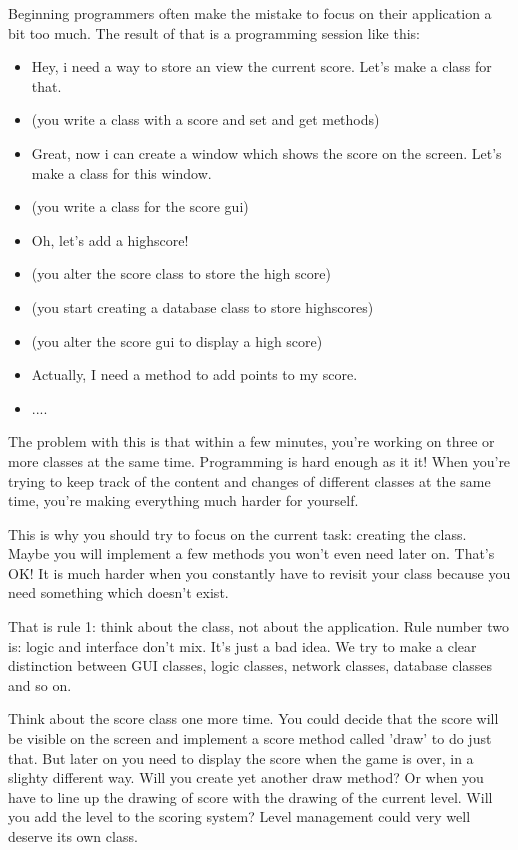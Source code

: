 Beginning programmers often make the mistake to focus on their application a bit too much. The result of that is a programming session like this:

\begin{itemize}
  \item Hey, i need a way to store an view the current score. Let's make a class for that.
  \item (you write a class with a score and set and get methods)
  \item Great, now i can create a window which shows the score on the screen. Let's make a class for this window.
  \item (you write a class for the score gui)
  \item Oh, let's add a highscore!
  \item (you alter the score class to store the high score)
  \item (you start creating a database class to store highscores)
  \item (you alter the score gui to display a high score)
  \item Actually, I need a method to add points to my score.
  \item ....
\end{itemize}

The problem with this is that within a few minutes, you're working on three or more classes at the same time. Programming is hard enough as it it! When you're trying to keep track of the content and changes of different classes at the same time, you're making everything much harder for yourself.

This is why you should try to focus on the current task: creating the class. Maybe you will implement a few methods you won't even need later on. That's OK! It is much harder when you constantly have to revisit your class because you need something which doesn't exist.

That is rule 1: think about the class, not about the application. Rule number two is: logic and interface don't mix. It's just a bad idea. We try to make a clear distinction between GUI classes, logic classes, network classes, database classes and so on.

Think about the score class one more time. You could decide that the score will be visible on the screen and implement a score method called 'draw' to do just that. But later on you need to display the score when the game is over, in a slighty different way. Will you create yet another draw method? Or when you have to line up the drawing of score with the drawing of the current level. Will you add the level to the scoring system? Level management could very well deserve its own class.

